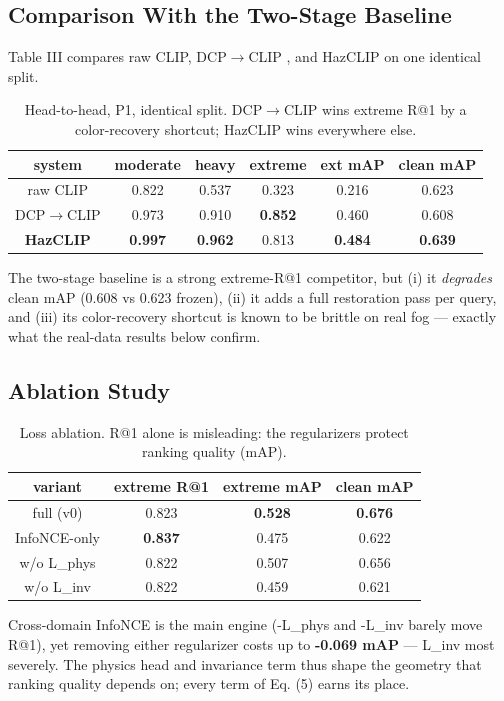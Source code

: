 \documentclass[journal]{IEEEtran}
\begin{document}
\subsection{Comparison With the Two-Stage Baseline}
Table III compares raw CLIP, DCP$\rightarrow$CLIP \cite{he2010dcp}, and HazCLIP on one
identical split.
\begin{table}[!t]
\caption{Head-to-head, P1, identical split. DCP$\rightarrow$CLIP wins extreme R@1 by a color-recovery shortcut; HazCLIP wins everywhere else.}
\label{tab:headtoheadp1id}
\centering\footnotesize\setlength{\tabcolsep}{4pt}
\begin{tabular}{@{}cccccc@{}}\toprule
\textbf{system} & \textbf{moderate} & \textbf{heavy} & \textbf{extreme} & \textbf{ext mAP} & \textbf{clean mAP} \\
\midrule
raw CLIP & 0.822 & 0.537 & 0.323 & 0.216 & 0.623 \\
DCP$\rightarrow$CLIP & 0.973 & 0.910 & \textbf{0.852} & 0.460 & 0.608 \\
\textbf{HazCLIP} & \textbf{0.997} & \textbf{0.962} & 0.813 & \textbf{0.484} & \textbf{0.639} \\
\bottomrule\end{tabular}
\end{table}
The two-stage baseline is a strong extreme-R@1 competitor, but (i) it
\emph{degrades} clean mAP (0.608 vs 0.623 frozen), (ii) it adds a full
restoration pass per query, and (iii) its color-recovery shortcut is known
to be brittle on real fog \cite{wang2024ucldehaze,ju2021ide} --- exactly
what the real-data results below confirm.
\subsection{Ablation Study}
\begin{table}[!t]
\caption{Loss ablation. R@1 alone is misleading: the regularizers protect ranking quality (mAP).}
\label{tab:lossablationr1a}
\centering\footnotesize\setlength{\tabcolsep}{4pt}
\begin{tabular}{@{}cccc@{}}\toprule
\textbf{variant} & \textbf{extreme R@1} & \textbf{extreme mAP} & \textbf{clean mAP} \\
\midrule
full (v0) & 0.823 & \textbf{0.528} & \textbf{0.676} \\
InfoNCE-only & \textbf{0.837} & 0.475 & 0.622 \\
w/o L\_phys & 0.822 & 0.507 & 0.656 \\
w/o L\_inv & 0.822 & 0.459 & 0.621 \\
\bottomrule\end{tabular}
\end{table}
Cross-domain InfoNCE is the main engine (-L\_phys and -L\_inv barely move
R@1), yet removing either regularizer costs up to \textbf{-0.069 mAP} --- L\_inv
most severely. The physics head and invariance term thus shape the
geometry that ranking quality depends on; every term of Eq. (5) earns its
place.
\end{document}
